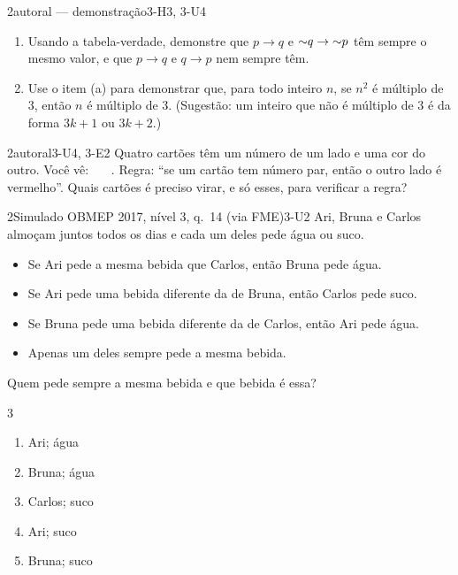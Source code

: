 \begin{questao}{2}{autoral — demonstração}{3-H3, 3-U4}\label{u3:q9}
\begin{enumerate}[label=\alph*)]
  \item Usando a tabela-verdade, demonstre que $p\rightarrow q$ e ${{\sim}}q\rightarrow{{\sim}}p$ têm sempre o mesmo valor, e que $p\rightarrow q$ e $q\rightarrow p$ nem sempre têm.
  \item Use o item (a) para demonstrar que, para todo inteiro $n$, se $n^2$ é múltiplo de 3, então $n$ é múltiplo de 3. (Sugestão: um inteiro que não é múltiplo de 3 é da forma $3k+1$ ou $3k+2$.)
\end{enumerate}
\end{questao}

\begin{questao}{2}{autoral}{3-U4, 3-E2}\label{u3:q10}
Quatro cartões têm um número de um lado e uma cor do outro. Você vê: \mbox{\ \ \ }. Regra: \enquote{se um cartão tem número par, então o outro lado é vermelho}. Quais cartões é preciso virar, e só esses, para verificar a regra?
\end{questao}

\begin{questao}{2}{Simulado OBMEP 2017, nível 3, q.~14 (via FME)}{3-U2}\label{u3:q11}
Ari, Bruna e Carlos almoçam juntos todos os dias e cada um deles pede água ou suco.
\begin{itemize}
  \item Se Ari pede a mesma bebida que Carlos, então Bruna pede água.
  \item Se Ari pede uma bebida diferente da de Bruna, então Carlos pede suco.
  \item Se Bruna pede uma bebida diferente da de Carlos, então Ari pede água.
  \item Apenas um deles sempre pede a mesma bebida.
\end{itemize}
Quem pede sempre a mesma bebida e que bebida é essa?
\begin{multicols}{3}
\begin{enumerate}[label=(\alph*)]
  \item Ari; água
  \item Bruna; água
  \item Carlos; suco
  \item Ari; suco
  \item Bruna; suco
\end{enumerate}
\end{multicols}
\end{questao}

